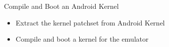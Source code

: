 \setuplabframe
{Compile and Boot an Android Kernel}
{
  \begin{itemize}
  \item Extract the kernel patchset from Android Kernel
  \item Compile and boot a kernel for the emulator
  \end{itemize}
}